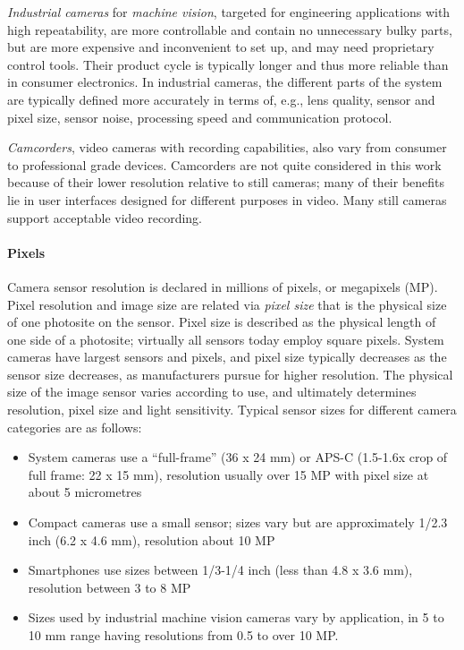 \emph{Industrial cameras} for \emph{machine vision}, targeted for engineering applications with high repeatability, are more controllable and contain no unnecessary bulky parts, but are more expensive and inconvenient to set up, and may need proprietary control tools.
Their product cycle is typically longer and thus more reliable than in consumer electronics.
In industrial cameras, the different parts of the system are typically defined more accurately in terms of, e.g., lens quality, sensor and pixel size, sensor noise, processing speed and communication protocol.

\emph{Camcorders}, video cameras with recording capabilities, also vary from consumer to professional grade devices.
Camcorders are not quite considered in this work because of their lower resolution relative to still cameras; many of their benefits lie in user interfaces designed for different purposes in video.
Many still cameras support acceptable video recording.


\paragraph{Pixels}
Camera sensor resolution is declared in millions of pixels, or megapixels (MP).
Pixel resolution and image size are related via \emph{pixel size} that is the physical size of one photosite on the sensor.
Pixel size is described as the physical length of one side of a photosite; virtually all sensors today employ square pixels.
System cameras have largest sensors and pixels, and pixel size typically decreases as the sensor size decreases, as manufacturers pursue for higher resolution.
The physical size of the image sensor varies according to use, and ultimately determines resolution, pixel size and light sensitivity.
Typical sensor sizes for different camera categories are as follows:

\begin{itemize}
	\item System cameras use a ``full-frame'' (36 x 24 mm) or APS-C (1.5-1.6x crop of full frame: 22 x 15 mm), resolution usually over 15 MP with pixel size at about 5 micrometres
	\item Compact cameras use a small sensor; sizes vary but are approximately 1/2.3 inch (6.2 x 4.6 mm), resolution about 10 MP
	\item Smartphones use sizes between 1/3-1/4 inch (less than 4.8 x 3.6 mm), resolution between 3 to 8 MP
	\item Sizes used by industrial machine vision cameras vary by application, in 5 to 10 mm range having resolutions from 0.5 to over 10 MP.
\end{itemize}

